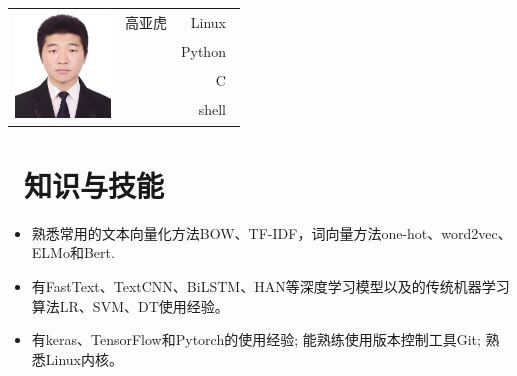 \documentclass[10pt]{resume}
\begin{document}

\Large{
  \begin{tabu}{ c l r }
     & \scshape{高亚虎} & {Linux~} \\
    &  & {Python~} \\
    &  & {C~} \\
    &  & {shell~}
  \end{tabu}
}

\section{\faGraduationCap\ 知识与技能}\normalsize
\begin{itemize}
  \item {熟悉常用的文本向量化方法BOW、TF-IDF，词向量方法one-hot、word2vec、ELMo和Bert.}
  \item {有FastText、TextCNN、BiLSTM、HAN等深度学习模型以及的传统机器学习算法LR、SVM、DT使用经验。}
  \item {有keras、TensorFlow和Pytorch的使用经验; 能熟练使用版本控制工具Git; 熟悉Linux内核。}
  \end{itemize}
\end{document}
